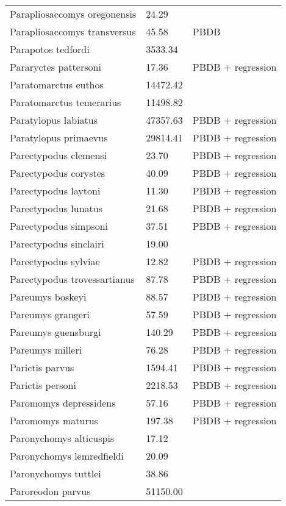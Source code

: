 \documentclass{article}
\begin{document}
\begin{center}
\begin{longtable}{p{} p{} p{} }
  Parapliosaccomys oregonensis & 24.29 & \cite{Tomiya2013} \\ 
  Parapliosaccomys transversus & 45.58 & PBDB \\ 
  Parapotos tedfordi & 3533.34 & \cite{Tomiya2013} \\ 
  Pararyctes pattersoni & 17.36 & PBDB + regression \\ 
  Paratomarctus euthos & 14472.42 & \cite{Tomiya2013} \\ 
  Paratomarctus temerarius & 11498.82 & \cite{Tomiya2013} \\ 
  Paratylopus labiatus & 47357.63 & PBDB + regression \\ 
  Paratylopus primaevus & 29814.41 & PBDB + regression \\ 
  Parectypodus clemensi & 23.70 & PBDB + regression \\ 
  Parectypodus corystes & 40.09 & PBDB + regression \\ 
  Parectypodus laytoni & 11.30 & PBDB + regression \\ 
  Parectypodus lunatus & 21.68 & PBDB + regression \\ 
  Parectypodus simpsoni & 37.51 & PBDB + regression \\ 
  Parectypodus sinclairi & 19.00 & \cite{Wilson2012} \\ 
  Parectypodus sylviae & 12.82 & PBDB + regression \\ 
  Parectypodus trovessartianus & 87.78 & PBDB + regression \\ 
  Pareumys boskeyi & 88.57 & PBDB + regression \\ 
  Pareumys grangeri & 57.59 & PBDB + regression \\ 
  Pareumys guensburgi & 140.29 & PBDB + regression \\ 
  Pareumys milleri & 76.28 & PBDB + regression \\ 
  Parictis parvus & 1594.41 & PBDB + regression \\ 
  Parictis personi & 2218.53 & PBDB + regression \\ 
  Paromomys depressidens & 57.16 & PBDB + regression \\ 
  Paromomys maturus & 197.38 & PBDB + regression \\ 
  Paronychomys alticuspis & 17.12 & \cite{Tomiya2013} \\ 
  Paronychomys lemredfieldi & 20.09 & \cite{Tomiya2013} \\ 
  Paronychomys tuttlei & 38.86 & \cite{Tomiya2013} \\ 
  Paroreodon parvus & 51150.00 & \cite{McKenna2011} \\ 

\end{longtable}
\end{center}
\end{document}
